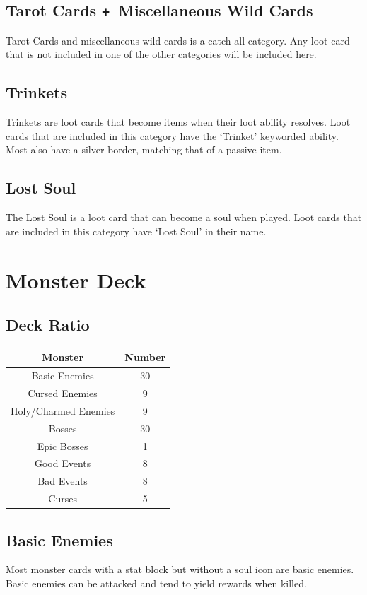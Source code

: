 \documentclass[a4paper, twoside]{report} %
\def\plus{\texttt{+}}
\begin{document}
    \subsection*{Tarot Cards \plus\ Miscellaneous Wild Cards}
    Tarot Cards and miscellaneous wild cards is a catch-all category. Any loot card that is not included in one of the other categories will be included here.
    \subsection*{Trinkets}
    Trinkets are loot cards that become items when their loot ability resolves. Loot cards that are included in this category have the ‘Trinket’ keyworded ability. Most also have a silver border, matching that of a passive item.
    \subsection*{Lost Soul}
    The Lost Soul is a loot card that can become a soul when played. Loot cards that are included in this category have ‘Lost Soul’ in their name.

    \section{Monster Deck}
    \subsection*{Deck Ratio}
    \begin{tabular}{ | c | c | }
        \hline
        \textbf{Monster} & \textbf{Number}\\
        \hline 
        Basic Enemies & 30\\
        Cursed Enemies & 9\\
        Holy/Charmed Enemies & 9\\
        Bosses & 30\\
        Epic Bosses & 1\\
        Good Events & 8\\
        Bad Events & 8\\
        Curses & 5\\
        \hline
    \end{tabular}
    \subsection*{Basic Enemies}
    Most monster cards with a stat block but without a soul icon are basic enemies. Basic enemies can be attacked and tend to yield rewards when killed.
\end{document}
